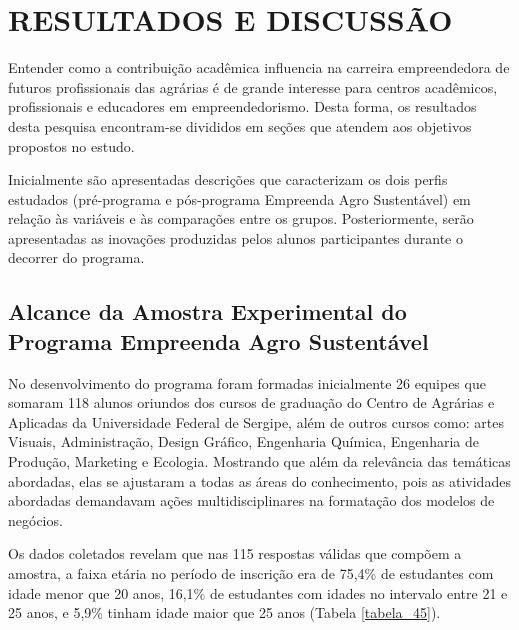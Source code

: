 \chapter{RESULTADOS E DISCUSSÃO}

Entender como a contribuição acadêmica influencia na carreira empreendedora de futuros profissionais das agrárias é de grande interesse para centros acadêmicos, profissionais e educadores em empreendedorismo. Desta forma, os resultados desta pesquisa encontram-se divididos em seções que atendem aos objetivos propostos no estudo.

Inicialmente são apresentadas descrições que caracterizam os dois perfis estudados (pré-programa e pós-programa Empreenda Agro Sustentável) em relação às variáveis e às comparações entre os grupos. Posteriormente, serão apresentadas as inovações produzidas pelos alunos participantes durante o decorrer do programa.


\section{Alcance da Amostra Experimental do Programa Empreenda Agro Sustentável}

No desenvolvimento do programa foram formadas inicialmente 26 equipes que somaram 118 alunos oriundos dos cursos de graduação do Centro de Agrárias e Aplicadas da Universidade Federal de Sergipe, além de outros cursos como: artes Visuais, Administração, Design Gráfico, Engenharia Química, Engenharia de Produção, Marketing e Ecologia. Mostrando que além da relevância das temáticas abordadas, elas se ajustaram a todas as áreas do conhecimento, pois as atividades abordadas demandavam ações multidisciplinares na formatação dos modelos de negócios. 

Os dados coletados revelam que nas 115 respostas válidas que compõem a amostra, a faixa etária no período de inscrição era de 75,4\% de estudantes com idade menor que 20 anos, 16,1\% de estudantes com idades no intervalo entre 21 e 25 anos, e 5,9\% tinham idade maior que 25 anos (Tabela \ref{tabela_45}).
 
